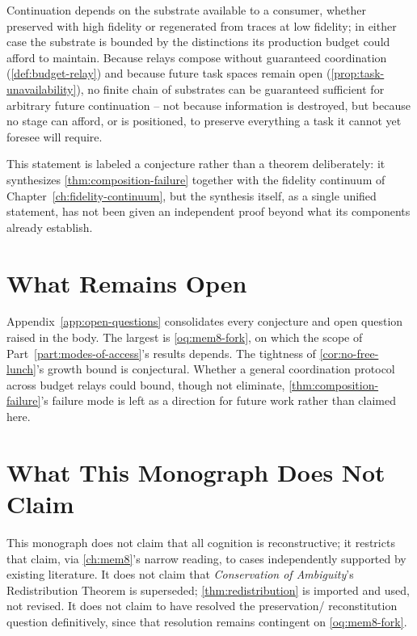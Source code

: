 \begin{conjecture}
\label{conj:closing}
Continuation depends on the substrate available to a consumer, whether
preserved with high fidelity or regenerated from traces at low
fidelity; in either case the substrate is bounded by the distinctions
its production budget could afford to maintain. Because relays compose
without guaranteed coordination (\cref{def:budget-relay}) and because
future task spaces remain open (\cref{prop:task-unavailability}), no
finite chain of substrates can be guaranteed sufficient for arbitrary
future continuation -- not because information is destroyed, but
because no stage can afford, or is positioned, to preserve everything
a task it cannot yet foresee will require.
\end{conjecture}

This statement is labeled a conjecture rather than a theorem
deliberately: it synthesizes \cref{thm:composition-failure} together
with the fidelity continuum of Chapter~\ref{ch:fidelity-continuum},
but the synthesis itself, as a single unified statement, has not been
given an independent proof beyond what its components already
establish.

\section{What Remains Open}

Appendix~\ref{app:open-questions} consolidates every conjecture and
open question raised in the body. The largest is
\cref{oq:mem8-fork}, on which the scope of Part~\ref{part:modes-of-access}'s
results depends. The tightness of \cref{cor:no-free-lunch}'s growth
bound is conjectural. Whether a general coordination protocol across
budget relays could bound, though not eliminate,
\cref{thm:composition-failure}'s failure mode is left as a direction
for future work rather than claimed here.

\section{What This Monograph Does Not Claim}

This monograph does not claim that all cognition is reconstructive; it
restricts that claim, via \cref{ch:mem8}'s narrow reading, to cases
independently supported by existing literature. It does not claim that
\emph{Conservation of Ambiguity}'s Redistribution Theorem is
superseded; \cref{thm:redistribution} is imported and used, not
revised. It does not claim to have resolved the preservation/
reconstitution question definitively, since that resolution remains
contingent on \cref{oq:mem8-fork}.
